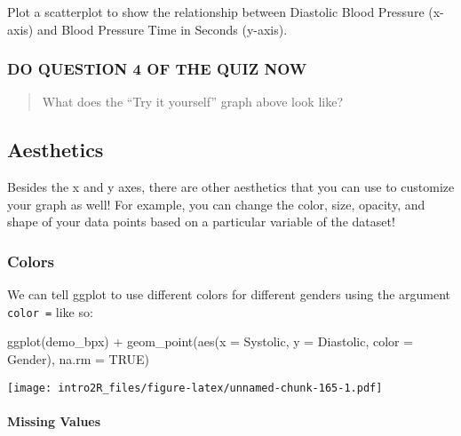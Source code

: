 \documentclass[
]{book}
\newenvironment{Shaded}{\begin{snugshade}}{\end{snugshade}}
\newcommand{\AttributeTok}[1]{\textcolor[rgb]{0.77,0.63,0.00}{#1}}
\newcommand{\ConstantTok}[1]{\textcolor[rgb]{0.00,0.00,0.00}{#1}}
\newcommand{\FunctionTok}[1]{\textcolor[rgb]{0.00,0.00,0.00}{#1}}
\newcommand{\NormalTok}[1]{#1}
\newcommand{\SpecialCharTok}[1]{\textcolor[rgb]{0.00,0.00,0.00}{#1}}
\begin{document}
Plot a scatterplot to show the relationship between Diastolic Blood Pressure (x-axis) and Blood Pressure Time in Seconds (y-axis).

\hypertarget{do-question-4-of-the-quiz-now-1}{%
\subsubsection{DO QUESTION 4 OF THE QUIZ NOW}\label{do-question-4-of-the-quiz-now-1}}

\begin{quote}
What does the ``Try it yourself'' graph above look like?
\end{quote}

\hypertarget{aesthetics}{%
\subsection{Aesthetics}\label{aesthetics}}

Besides the x and y axes, there are other aesthetics that you can use to customize your graph as well! For example, you can change the color, size, opacity, and shape of your data points based on a particular variable of the dataset!

\hypertarget{colors}{%
\subsubsection{Colors}\label{colors}}

We can tell ggplot to use different colors for different genders using the argument \texttt{color\ =} like so:

\begin{Shaded}
\begin{Highlighting}[]
\FunctionTok{ggplot}\NormalTok{(demo\_bpx) }\SpecialCharTok{+}
  \FunctionTok{geom\_point}\NormalTok{(}\FunctionTok{aes}\NormalTok{(}\AttributeTok{x =}\NormalTok{ Systolic,}
                 \AttributeTok{y =}\NormalTok{ Diastolic,}
                 \AttributeTok{color =}\NormalTok{ Gender), }
             \AttributeTok{na.rm =} \ConstantTok{TRUE}\NormalTok{)}
\end{Highlighting}
\end{Shaded}

\texttt{[image: intro2R\_files/figure-latex/unnamed-chunk-165-1.pdf]}

\hypertarget{missing-values-3}{%
\paragraph{Missing Values}\label{missing-values-3}}
\end{document}
